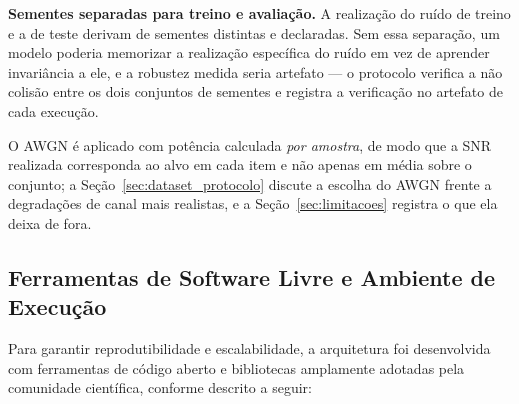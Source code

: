 \documentclass[12pt,a4paper]{article}
\begin{document}
\textbf{Sementes separadas para treino e avaliação.} A realização do ruído de
treino e a de teste derivam de sementes distintas e declaradas. Sem essa
separação, um modelo poderia memorizar a realização específica do ruído em vez
de aprender invariância a ele, e a robustez medida seria artefato --- o
protocolo verifica a não colisão entre os dois conjuntos de sementes e registra
a verificação no artefato de cada execução.

O AWGN é aplicado com potência calculada \emph{por amostra}, de modo que a SNR
realizada corresponda ao alvo em cada item e não apenas em média sobre o
conjunto; a Seção~\ref{sec:dataset_protocolo} discute a escolha do AWGN frente
a degradações de canal mais realistas, e a Seção~\ref{sec:limitacoes} registra
o que ela deixa de fora.

\subsection{Ferramentas de Software Livre e Ambiente de Execução}
\label{sec:software}

Para garantir reprodutibilidade e escalabilidade, a arquitetura foi
desenvolvida com ferramentas de código aberto e bibliotecas amplamente adotadas
pela comunidade científica, conforme descrito a seguir:
\end{document}
